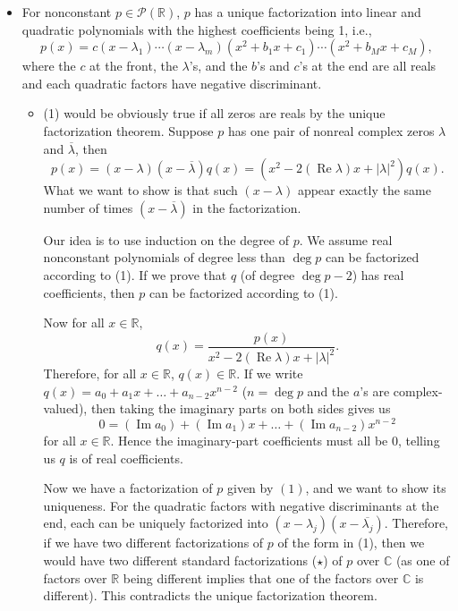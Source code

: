 \documentclass{article}
\newcommand{\R}{\mathbb{R}}
\newcommand{\C}{\mathbb{C}}
\renewcommand{\Re}{\operatorname{Re}}
\renewcommand{\Im}{\operatorname{Im}}
\newcommand{\conj}[1]{\overline{#1}}
\begin{document}
\begin{itemize}
    \item For nonconstant $p \in \mathcal{P}(\R)$, $p$ has a unique factorization into linear and quadratic polynomials with the highest coefficients being 1, i.e.,
    \begin{equation}
        p(x)=c(x-\lambda_1)\cdots(x-\lambda_m)(x^2+b_1x+c_1)\cdots(x^2+b_Mx+c_M),
    \end{equation} where the $c$ at the front, the $\lambda$'s, and the $b$'s and $c$'s at the end are all reals and each quadratic factors have negative discriminant.
    \begin{itemize}
        \item (1) would be obviously true if all zeros are reals by the unique factorization theorem. Suppose $p$ has one pair of nonreal complex zeros $\lambda$ and $\conj{\lambda}$, then $$p(x) = (x-\lambda)(x-\conj{\lambda})q(x) = (x^2-2(\Re{\lambda})x+|\lambda|^2)q(x).$$ What we want to show is that such $(x - \lambda)$ appear exactly the same number of times $(x - \conj{\lambda})$ in the factorization.
        
        Our idea is to use induction on the degree of $p$. We assume real nonconstant polynomials of degree less than $\deg p$ can be factorized according to (1). If we prove that $q$ (of degree $\deg p-2$) has real coefficients, then $p$ can be factorized according to (1).
        
        Now for all $x \in \R$, $$q(x) = \frac{p(x)}{x^2-2(\Re{\lambda})x+|\lambda|^2}.$$ Therefore, for all $x \in \R$, $q(x) \in \R$. If we write $q(x) = a_0+a_1x+\dots+a_{n-2}x^{n-2}$ ($n = \deg p$ and the $a$'s are complex-valued), then taking the imaginary parts on both sides gives us $$0 = (\Im a_0)+(\Im a_1)x+\dots+(\Im a_{n-2})x^{n-2}$$ for all $x \in \R$. Hence the imaginary-part coefficients must all be $0$, telling us $q$ is of real coefficients.
        
        Now we have a factorization of $p$ given by $(1)$, and we want to show its uniqueness. For the quadratic factors with negative discriminants at the end, each can be uniquely factorized into $(x-\lambda_j)(x-\conj{\lambda_j})$. Therefore, if we have two different factorizations of $p$ of the form in (1), then we would have two different standard factorizations ($\star$) of $p$ over $\C$ (as one of factors over $\R$ being different implies that one of the factors over $\C$ is different). This contradicts the unique factorization theorem.
    \end{itemize}
\end{itemize}
\end{document}
